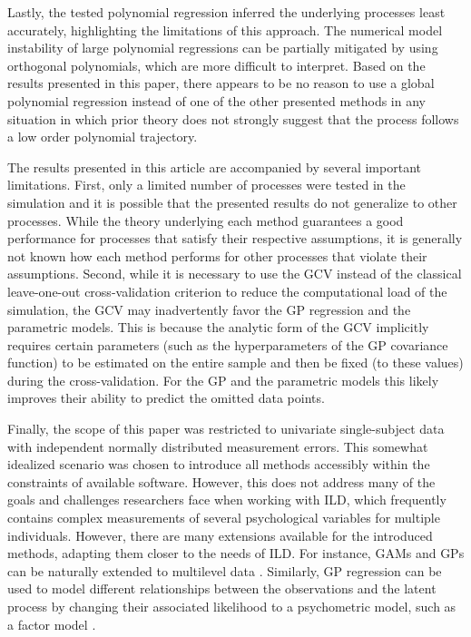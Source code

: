 \documentclass[man, floatsintext]{apa7}
\begin{document}
Lastly,
the tested polynomial regression inferred the underlying processes least
accurately, highlighting the limitations of this approach. The numerical model
instability of large polynomial regressions can be partially mitigated by using
orthogonal polynomials, which are more difficult to interpret. Based on
the results presented in this paper, there appears to be no reason to use a
global polynomial regression instead of one of the other presented methods in
any situation in which prior theory does not strongly suggest that the process
follows a low order polynomial trajectory.

The results presented in this article are accompanied by several important
limitations. First, only a limited number of processes were tested in the
simulation and it is possible that the presented results do not generalize to
other processes. While the theory underlying each method guarantees a good
performance for processes that satisfy their respective assumptions, it is
generally not known how each method performs for other processes that violate
their assumptions. Second, while it is necessary to use the GCV instead of the
classical leave-one-out cross-validation criterion to reduce the computational
load of the simulation, the GCV may inadvertently favor the GP regression and
the parametric models. This is because the analytic form of the GCV
implicitly requires certain parameters (such as the hyperparameters of the GP
covariance function) to be estimated on the entire sample and then be fixed (to
these values) during the cross-validation. For the GP and the parametric models
this likely improves their ability to predict the omitted data points.

Finally, the scope of this paper was restricted to univariate single-subject
data with independent normally distributed measurement errors. This somewhat
idealized scenario was chosen to introduce all methods accessibly within the
constraints of available software. However, this does not address many of the
goals and challenges researchers face when working with ILD, which
frequently contains complex measurements of several psychological variables for
multiple individuals. However, there are many extensions available for the
introduced methods, adapting them closer to the needs of ILD\@. For instance,
GAMs and GPs can be naturally extended to multilevel data
\parencite{karch_gaussian_2020, wood_generalized_2006}. Similarly, GP
regression can be used to model different relationships between the
observations and the latent process by changing their associated likelihood to
a psychometric model, such as a factor model \parencite{clark_dynamic_2023,
  yu_gaussian-process_2009}.
\end{document}
